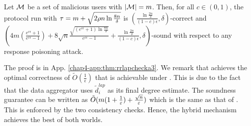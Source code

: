 \begin{thm}\label{chap4-thm:rrlapchecka3}
	Let $\mathcal{M}$ be a set of malicious users with $|\mathcal{M}| = m$.
    Then, for all $c \in (0,1)$, the \DegHybrid{} protocol run with $\tau = {m + \sqrt{2\rho n \ln \frac{8n}{\delta}}}$ is $(\frac{\ln \frac{2n}{\delta}}{(1-c)\epsilon}, \delta)$-correct and $\left( 4m (\frac{e^{c\epsilon}+1}{e^{c\epsilon}-1}) + 8\sqrt{n}\frac{ \sqrt{(e^{c\epsilon}+1)\ln \frac{8n}{\delta}}}{e^{c\epsilon}-1} + \frac{\ln \frac{2n}{\delta}}{(1-c)\epsilon}, \delta\right)$-sound with respect to any response poisoning attack. \label{chap4-thm:response:hybrid}
\end{thm}

The proof is in App. \ref{chap4-app:thm:rrlapchecka3}. We remark that \DegHybrid{} achieves the optimal correctness of $\tilde{O}(\frac{1}{\epsilon})$ that is achievable under \ldp. This is due to the fact that the data aggregator uses $\tilde{d}^{lap}_i$ as its final degree estimate. The soundness guarantee can be written as $\tilde{O}(m(1+\frac{1}{\varepsilon}) + \frac{\sqrt{n}}{\varepsilon})$ which is the same as that of \DegRRCheck{}. This is enforced by the two consistency checks.   Hence, the hybrid mechanism achieves the best of both worlds.
